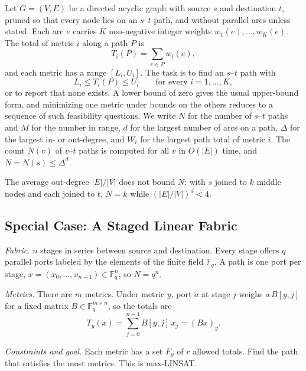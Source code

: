 \documentclass[journal]{IEEEtran}
\begin{document}
Let $G=(V,E)$ be a directed acyclic graph with source $s$ and destination $t$, pruned so that every node lies on an $s$--$t$ path, and without parallel arcs unless stated. Each arc $e$ carries $K$ non-negative integer weights $w_{1}(e),\dots,w_{K}(e)$. The total of metric $i$ along a path $P$ is
\begin{equation}
  T_{i}(P) = \sum_{e \in P} w_{i}(e),
  \label{eq:total}
\end{equation}
and each metric has a range $[L_{i},U_{i}]$. The task is to find an $s$--$t$ path with
\begin{equation}
  L_{i} \le T_{i}(P) \le U_{i} \qquad \text{for every } i = 1,\dots,K,
  \label{eq:ranges}
\end{equation}
or to report that none exists. A lower bound of zero gives the usual upper-bound form, and minimizing one metric under bounds on the others reduces to a sequence of such feasibility questions. We write $N$ for the number of $s$--$t$ paths and $M$ for the number in range, $d$ for the largest number of arcs on a path, $\Delta$ for the largest in- or out-degree, and $W_{i}$ for the largest path total of metric $i$. The count $N(v)$ of $v$--$t$ paths is computed for all $v$ in $O(|E|)$ time, and $N = N(s) \le \Delta^{d}$.

The average out-degree $|E|/|V|$ does not bound $N$: with $s$ joined to $k$ middle nodes and each joined to $t$, $N = k$ while $(|E|/|V|)^{d} < 4$.

\subsection{Special Case: A Staged Linear Fabric}
\label{sec:fabric}

\emph{Fabric.} $n$ stages in series between source and destination. Every stage offers $q$ parallel ports labeled by the elements of the finite field $\mathbb{F}_{q}$. A path is one port per stage, $x=(x_{0},\dots,x_{n-1})\in\mathbb{F}_{q}^{n}$, so $N=q^{n}$.

\emph{Metrics.} There are $m$ metrics. Under metric $y$, port $a$ at stage $j$ weighs $a\,B[y,j]$ for a fixed matrix $B\in\mathbb{F}_{q}^{m\times n}$, so the totals are
\begin{equation}
  T_{y}(x) = \sum_{j=0}^{n-1} B[y,j]\,x_{j} = (Bx)_{y}.
  \label{eq:modtotal}
\end{equation}

\emph{Constraints and goal.} Each metric has a set $F_{y}$ of $r$ allowed totals. Find the path that satisfies the most metrics. This is max-LINSAT.
\end{document}

